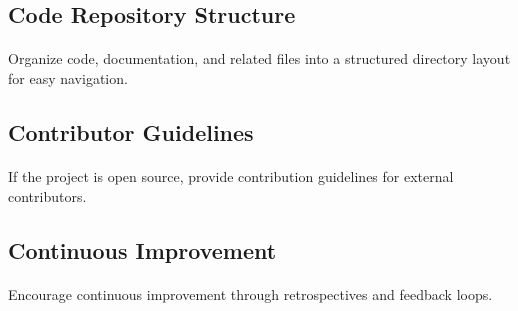 \documentclass{article}
\begin{document}
\subsection{Code Repository Structure}
\paragraph{}
Organize code, documentation, and related files into a structured directory layout for easy navigation.

\subsection{Contributor Guidelines}
\paragraph{}
If the project is open source, provide contribution guidelines for external contributors.

\subsection{Continuous Improvement}
\paragraph{}
Encourage continuous improvement through retrospectives and feedback loops.
\end{document}
